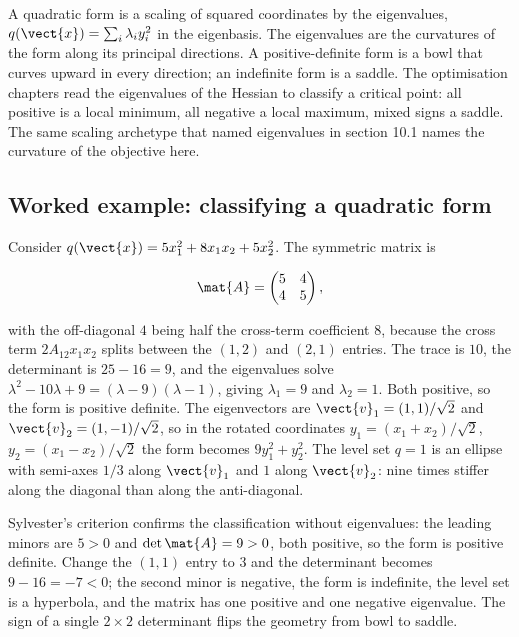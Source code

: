 \begin{archetype}
A quadratic form is a scaling of squared coordinates by the
eigenvalues, $q(\vect{x}) = \sum_{i} \lambda_{i} y_{i}^{2}$ in the
eigenbasis. The eigenvalues are the curvatures of the form along its
principal directions. A positive-definite form is a bowl that curves
upward in every direction; an indefinite form is a saddle. The
optimisation chapters read the eigenvalues of the Hessian to
classify a critical point: all positive is a local minimum, all
negative a local maximum, mixed signs a saddle. The same scaling
archetype that named eigenvalues in section 10.1 names the curvature
of the objective here.
\end{archetype}

\subsection{Worked example: classifying a quadratic form}

Consider $q(\vect{x}) = 5x_{1}^{2} + 8x_{1}x_{2} + 5x_{2}^{2}$. The
symmetric matrix is

\[
\mat{A} = \begin{pmatrix} 5 & 4 \\ 4 & 5 \end{pmatrix},
\]

with the off-diagonal $4$ being half the cross-term coefficient $8$,
because the cross term $2 A_{12} x_{1} x_{2}$ splits between the
$(1,2)$ and $(2,1)$ entries. The trace is $10$, the determinant is
$25 - 16 = 9$, and the eigenvalues solve $\lambda^{2} - 10\lambda +
9 = (\lambda - 9)(\lambda - 1)$, giving $\lambda_{1} = 9$ and
$\lambda_{2} = 1$. Both positive, so the form is positive definite.
The eigenvectors are $\vect{v}_{1} = (1, 1)/\sqrt{2}$ and
$\vect{v}_{2} = (1, -1)/\sqrt{2}$, so in the rotated coordinates
$y_{1} = (x_{1} + x_{2})/\sqrt{2}$, $y_{2} = (x_{1} - x_{2})/\sqrt{2}$
the form becomes $9 y_{1}^{2} + y_{2}^{2}$. The level set
$q = 1$ is an ellipse with semi-axes $1/3$ along $\vect{v}_{1}$ and
$1$ along $\vect{v}_{2}$: nine times stiffer along the diagonal than
along the anti-diagonal.

Sylvester's criterion confirms the classification without
eigenvalues: the leading minors are $5 > 0$ and $\det \mat{A} = 9 >
0$, both positive, so the form is positive definite. Change the
$(1,1)$ entry to $3$ and the determinant becomes $9 - 16 = -7 < 0$;
the second minor is negative, the form is indefinite, the level set
is a hyperbola, and the matrix has one positive and one negative
eigenvalue. The sign of a single $2 \times 2$ determinant flips the
geometry from bowl to saddle.


